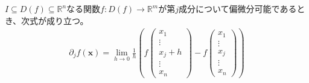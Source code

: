 \documentclass[dvipdfmx]{jsarticle}
\begin{document}
\begin{thm}\label{4.2.3.4}
$I \subseteq D(f) \subseteq \mathbb{R}^{n}$なる関数$f:D(f) \rightarrow \mathbb{R}^{m}$が第$j$成分について偏微分可能であるとき、次式が成り立つ。
\begin{align*}
\partial_{j}f\left( \mathbf{x} \right) = \lim_{h \rightarrow 0}\frac{1}{h}\left( f\left( \begin{matrix}
x_{1} \\
\vdots \\
x_{j} + h \\
\vdots \\
x_{n} 
\end{matrix} \right) - f\left( \begin{matrix}
x_{1} \\
\vdots \\
x_{j} \\
\vdots \\
x_{n} 
\end{matrix} \right) \right)
\end{align*}
\end{thm}
\end{document}
